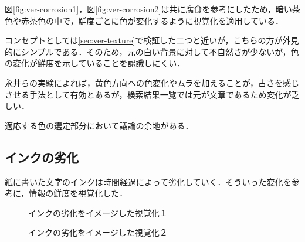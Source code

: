 図\ref{fig:ver-corrosion1}，図\ref{fig:ver-corrosion2}は共に腐食を参考にしたため，暗い茶色や赤茶色の中で，鮮度ごとに色が変化するように視覚化を適用している．

コンセプトとしては\ref{sec:ver-texture}で検証した二つと近いが，こちらの方が外見的にシンプルである．そのため，元の白い背景に対して不自然さが少ないが，色の変化が鮮度を示していることを認識しにくい．

永井らの実験によれば，黄色方向への色変化やムラを加えることが，古さを感じさせる手法として有効\cite{fading}とあるが，検索結果一覧では元が文章であるため変化が乏しい．

適応する色の選定部分において議論の余地がある．

\subsection{インクの劣化}
\label{subsec:ver-col-ink}

紙に書いた文字のインクは時間経過によって劣化していく．そういった変化を参考に，情報の鮮度を視覚化した．

\begin{figure}[htbp]
  \begin{minipage}{0.5\hsize}
    \begin{center}
    \end{center}
    \caption{インクの劣化をイメージした視覚化１}
    \label{fig:ver-ink1}
  \end{minipage}
  \begin{minipage}{0.5\hsize}
    \begin{center}
    \end{center}
    \caption{インクの劣化をイメージした視覚化２}
    \label{fig:ver-ink2}
  \end{minipage}
\end{figure}

